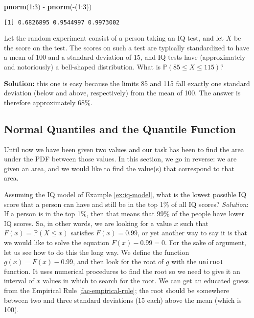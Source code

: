 \documentclass[]{book}
\newenvironment{Shaded}{\begin{snugshade}}{\end{snugshade}}
\newcommand{\KeywordTok}[1]{\textcolor[rgb]{0.13,0.29,0.53}{\textbf{{#1}}}}
\newcommand{\DecValTok}[1]{\textcolor[rgb]{0.00,0.00,0.81}{{#1}}}
\newcommand{\StringTok}[1]{\textcolor[rgb]{0.31,0.60,0.02}{{#1}}}
\newcommand{\NormalTok}[1]{{#1}}
\numberwithin{equation}{chapter}
\numberwithin{figure}{chapter}
\theoremstyle{plain}
\theoremstyle{definition}
\theoremstyle{remark}
\theoremstyle{definition}
\theoremstyle{definition}
\theoremstyle{remark}
\let\BeginKnitrBlock\begin \let\EndKnitrBlock\end
\begin{document}
\begin{Shaded}
\begin{Highlighting}[]
\KeywordTok{pnorm}\NormalTok{(}\DecValTok{1}\NormalTok{:}\DecValTok{3}\NormalTok{) -}\StringTok{ }\KeywordTok{pnorm}\NormalTok{(-(}\DecValTok{1}\NormalTok{:}\DecValTok{3}\NormalTok{))}
\end{Highlighting}
\end{Shaded}

\begin{verbatim}
[1] 0.6826895 0.9544997 0.9973002
\end{verbatim}

\bigskip

\BeginKnitrBlock{example}
\protect\hypertarget{ex:iq-model}{}{\label{ex:iq-model}}Let the random
experiment consist of a person taking an IQ test, and let \(X\) be the
score on the test. The scores on such a test are typically standardized
to have a mean of 100 and a standard deviation of 15, and IQ tests have
(approximately and notoriously) a bell-shaped distribution. What is
\(\mathbb{P}(85\leq X\leq115)\)?
\EndKnitrBlock{example}

\textbf{Solution:} this one is easy because the limits 85 and 115 fall
exactly one standard deviation (below and above, respectively) from the
mean of 100. The answer is therefore approximately 68\%.

\subsection{Normal Quantiles and the Quantile
Function}\label{sub-normal-quantiles-qf}

Until now we have been given two values and our task has been to find
the area under the PDF between those values. In this section, we go in
reverse: we are given an area, and we would like to find the value(s)
that correspond to that area.

\bigskip

\BeginKnitrBlock{example}
\protect\hypertarget{ex:iq-quantile-state-problem}{}{\label{ex:iq-quantile-state-problem}}Assuming
the IQ model of Example \ref{ex:iq-model}, what is the lowest possible
IQ score that a person can have and still be in the top 1\% of all IQ
scores? \emph{Solution}: If a person is in the top 1\%, then that means
that 99\% of the people have lower IQ scores. So, in other words, we are
looking for a value \(x\) such that \(F(x)=\mathbb{P}(X\leq x)\)
satisfies \(F(x)=0.99\), or yet another way to say it is that we would
like to solve the equation \(F(x)-0.99=0\). For the sake of argument,
let us see how to do this the long way. We define the function
\(g(x)=F(x)-0.99\), and then look for the root of \(g\) with the
\texttt{uniroot} function. It uses numerical procedures to find the root
so we need to give it an interval of \(x\) values in which to search for
the root. We can get an educated guess from the Empirical Rule
\ref{fac-empirical-rule}; the root should be somewhere between two and
three standard deviations (15 each) above the mean (which is 100).
\EndKnitrBlock{example}
\end{document}
